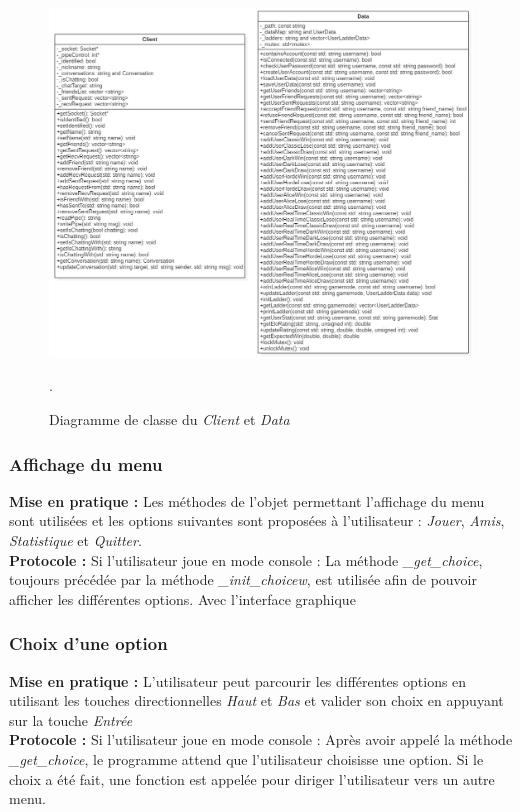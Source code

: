 \documentclass[10pt, a4paper]{article}
\begin{document}
\begin{figure}[H]
\centering
\includegraphics[scale=0.72]{client_data.png}
\caption{Diagramme de classe du \textit{Client} et \textit{Data}}.
\end{figure}



\subsubsection{Affichage du menu}
\textbf{Mise en pratique :} Les méthodes de l'objet permettant l'affichage du menu sont utilisées et les options suivantes sont proposées à l'utilisateur : \textit{Jouer}, \textit{Amis}, \textit{Statistique} et \textit{Quitter}.\\
\textbf{Protocole :} Si l'utilisateur joue en mode console : La méthode \textit{\_get\_choice}, toujours précédée par la méthode \textit{\_init\_choicew}, est utilisée afin de pouvoir afficher les différentes options. Avec l'interface graphique\\

\subsubsection{Choix d'une option}
\textbf{Mise en pratique :} L'utilisateur peut parcourir les différentes options en utilisant les touches directionnelles \textit{Haut} et \textit{Bas} et valider son choix en appuyant sur la touche \textit{Entrée} \\
\textbf{Protocole :} Si l'utilisateur joue en mode console :  Après avoir appelé la méthode \textit{\_get\_choice}, le programme attend que l'utilisateur choisisse une option. Si le choix a été fait, une fonction est appelée pour diriger l'utilisateur vers un autre menu.\\
\end{document}
